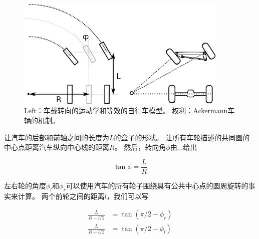 \begin{figure}[htb!]
	\centering
		\includegraphics[width=0.9\textwidth]{figs/ackermann.png}
	\caption {Left：车载转向的运动学和等效的自行车模型。 权利：Ackermann车辆的机制。}
	\label{fig:ackermann}
\end{figure}


让汽车的后部和前轴之间的长度为$ L $的盒子的形状。 让所有车轮描述的共同圆的中心点距离汽车纵向中心线的距离$ R $。 然后，转向角$ \phi $由...给出

\begin{equation}\label{eq:ackermann}
\tan \phi = \frac{L}{R}
\end{equation}


左右轮的角度$ \phi_l $和$ \phi_r $可以使用汽车的所有轮子围绕具有公共中心点的圆周旋转的事实来计算。 两个前轮之间的距离$ l $，我们可以写

\begin{eqnarray}
\frac{L}{R-l/2}&=\tan{(\pi/2-\phi_r)}\\
\frac{L}{R+l/2}&=\tan{(\pi/2-\phi_l)}
\end{eqnarray}


